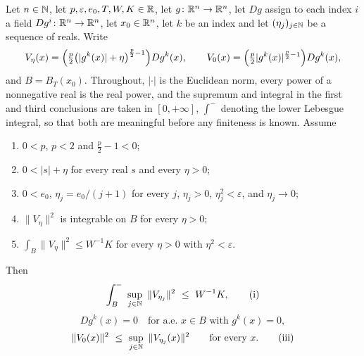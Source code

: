 \begin{helper}[The supremum of the regularised gradient fields, and the vanishing of $Dg^k$ on $\{g^k=0\}$]
Let $n\in\mathbb{N}$, let $p,\varepsilon,e_0,T,W,K\in\mathbb{R}$, let
$g\colon\mathbb{R}^n\to\mathbb{R}^n$, let $Dg$ assign to each index $i$ a field
$Dg^i\colon\mathbb{R}^n\to\mathbb{R}^n$, let $x_0\in\mathbb{R}^n$, let $k$ be an index and let
$(\eta_j)_{j\in\mathbb{N}}$ be a sequence of reals.  Write
\[
V_\eta(x)=\Bigl(\tfrac p2\bigl(|g^k(x)|+\eta\bigr)^{\frac p2-1}\Bigr)Dg^k(x),
\qquad
V_0(x)=\Bigl(\tfrac p2|g^k(x)|^{\frac p2-1}\Bigr)Dg^k(x),
\]
and $B=B_T(x_0)$.  Throughout, $|\cdot|$ is the Euclidean norm, every power of
a nonnegative real is the real power, and the supremum and integral in the
first and third conclusions are taken in $[0,+\infty]$, $\int^-$ denoting the
lower Lebesgue integral, so that both are meaningful before any finiteness is
known.  Assume
\begin{enumerate}
\item[(H1)] $0<p$, $p<2$ and $\frac p2-1<0$;
\item[(H2)] $0<|s|+\eta$ for every real $s$ and every $\eta>0$;
\item[(H3)] $0<e_0$, $\eta_j=e_0/(j+1)$ for every $j$, $\eta_j>0$,
  $\eta_j^2<\varepsilon$, and $\eta_j\to0$;
\item[(H4)] $\|V_\eta\|^2$ is integrable on $B$ for every $\eta>0$;
\item[(H5)] $\int_B\|V_\eta\|^2\le W^{-1}K$ for every $\eta>0$ with
  $\eta^2<\varepsilon$.
\end{enumerate}
Then
\[
\int^-_B\ \sup_{j\in\N}\ \|V_{\eta_j}\|^2\ \le\ W^{-1}K,
\tag{i}
\]
\[
Dg^k(x)=0\quad\text{for a.e.\ }x\in B\text{ with }g^k(x)=0,
\tag{ii}
\]
\[
\|V_0(x)\|^2\ \le\ \sup_{j\in\N}\ \|V_{\eta_j}(x)\|^2
\qquad\text{for every }x .
\tag{iii}
\]
\end{helper}
